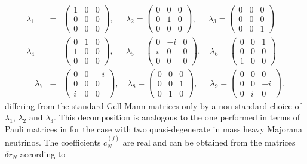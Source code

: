 \documentclass[12pt, a4paper]{article}
\begin{document}
\begin{eqnarray}
\lambda_1 &=& \begin{pmatrix} 1 & 0 & 0 \\ 0 & 0 & 0 \\ 0 & 0 & 0 \end{pmatrix},
\quad~~
\lambda_2 = \begin{pmatrix} 0 & 0 & 0 \\ 0 & 1 & 0 \\ 0 & 0 & 0 \end{pmatrix},\quad~~
\lambda_3 = \begin{pmatrix} 0 & 0 & 0 \\ 0 & 0 & 0 \\ 0 & 0 & 1 \end{pmatrix}\\
\lambda_4 &=& \begin{pmatrix} 0 & 1 & 0 \\ 1 & 0 & 0 \\ 0 & 0 & 0 \end{pmatrix},
\quad~~\lambda_5 = \begin{pmatrix} 0 & -i & 0 \\ i & 0 & 0 \\ 0 & 0 & 0 \end{pmatrix},
\quad
\lambda_6 = \begin{pmatrix} 0 & 0 & 1 \\ 0 & 0 & 0 \\ 1 & 0 & 0 \end{pmatrix}\\
\quad
\lambda_7 &=& \begin{pmatrix} 0 & 0 & -i \\ 0 & 0 & 0 \\ i & 0 & 0 \end{pmatrix},
\quad
\lambda_8 = \begin{pmatrix} 0 & 0 & 0 \\ 0 & 0 & 1 \\ 0 & 1 & 0 \end{pmatrix},
\quad~~
\lambda_9 = \begin{pmatrix} 0 & 0 & 0 \\ 0 & 0 & -i \\ 0 & i & 0 \end{pmatrix}.
\end{eqnarray}
differing from the standard Gell-Mann matrices only by a non-standard choice of $\lambda_1$, $\lambda_2$ and $\lambda_3$. This decomposition is analogous to the one performed in terms of Pauli matrices in \cite{Klaric:2021cpi} for the case with two quasi-degenerate in mass heavy Majorana neutrinos. The coefficients $c_N^{(j)}$ are real and can be obtained from the matrices $\delta r_N$ according to
\end{document}
